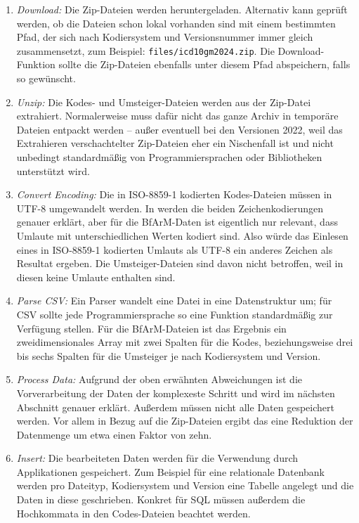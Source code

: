 \begin{enumerate}
\item \emph{Download:} Die Zip-Dateien werden heruntergeladen. Alternativ kann geprüft werden, ob die Dateien schon lokal vorhanden sind mit einem bestimmten Pfad, der sich nach Kodiersystem und Versionsnummer immer gleich zusammensetzt, zum Beispiel: \texttt{files/icd10gm2024.zip}. Die Download-Funktion sollte die Zip-Dateien ebenfalls unter diesem Pfad abspeichern, falls so gewünscht.
\item \emph{Unzip:} Die Kodes- und Umsteiger-Dateien werden aus der Zip-Datei extrahiert. Normalerweise muss dafür nicht das ganze Archiv in temporäre Dateien entpackt werden -- außer eventuell bei den Versionen 2022, weil das Extrahieren verschachtelter Zip-Dateien eher ein Nischenfall ist und nicht unbedingt standardmäßig von Programmiersprachen oder Bibliotheken unterstützt wird. 
\item \emph{Convert Encoding:} Die in ISO-8859-1 kodierten Kodes-Dateien müssen in UTF-8 umgewandelt werden. In \citep{charencoding} werden die beiden Zeichenkodierungen genauer erklärt, aber für die BfArM-Daten ist eigentlich nur relevant, dass Umlaute mit unterschiedlichen Werten kodiert sind. Also würde das Einlesen eines in ISO-8859-1 kodierten Umlauts als UTF-8 ein anderes Zeichen als Resultat ergeben. Die Umsteiger-Dateien sind davon nicht betroffen, weil in diesen keine Umlaute enthalten sind. 
\item \emph{Parse CSV:} Ein Parser wandelt eine Datei in eine Datenstruktur um; für CSV sollte jede Programmiersprache so eine Funktion standardmäßig zur Verfügung stellen. Für die BfArM-Dateien ist das Ergebnis ein zweidimensionales Array mit zwei Spalten für die Kodes, beziehungsweise drei bis sechs Spalten für die Umsteiger je nach Kodiersystem und Version. 
\item \emph{Process Data:} Aufgrund der oben erwähnten Abweichungen ist die Vorverarbeitung der Daten der komplexeste Schritt und wird im nächsten Abschnitt genauer erklärt. Außerdem müssen nicht alle Daten gespeichert werden. Vor allem in Bezug auf die Zip-Dateien ergibt das eine Reduktion der Datenmenge um etwa einen Faktor von zehn. 
\item \emph{Insert:} Die bearbeiteten Daten werden für die Verwendung durch Applikationen gespeichert. Zum Beispiel für eine relationale Datenbank werden pro Dateityp, Kodiersystem und Version eine Tabelle angelegt und die Daten in diese geschrieben. Konkret für SQL müssen außerdem die Hochkommata in den Codes-Dateien beachtet werden. 
\end{enumerate}

